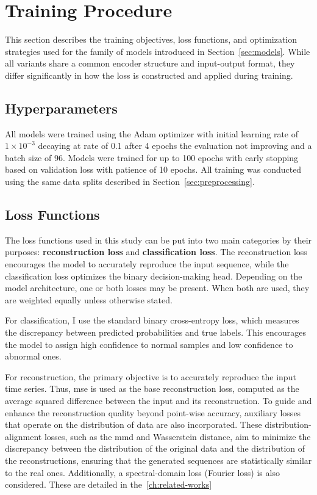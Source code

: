 \section{Training Procedure}
\label{sec:training}
This section describes the training objectives, loss functions, and optimization strategies used for the family of models introduced in Section~\ref{sec:models}.
While all variants share a common encoder structure and input-output format, they differ significantly in how the loss is constructed and applied during training.


\subsection{Hyperparameters}
All models were trained using the Adam optimizer with initial learning rate of $1\times10^{-3}$ decaying at rate of 0.1 after 4 epochs the evaluation not improving and a batch size of 96.
Models were trained for up to 100 epochs with early stopping based on validation loss with patience of 10 epochs.
All training was conducted using the same data splits described in Section~\ref{sec:preprocessing}.


\subsection{Loss Functions}
\label{subsec:loss}
The loss functions used in this study can be put into two main categories by their purposes: \textbf{reconstruction loss} and \textbf{classification loss}.
The reconstruction loss encourages the model to accurately reproduce the input sequence, while the classification loss optimizes the binary decision-making head.
Depending on the model architecture, one or both losses may be present.
When both are used, they are weighted equally unless otherwise stated.

For classification, I use the standard binary cross-entropy loss, which measures the discrepancy between predicted probabilities and true labels.
This encourages the model to assign high confidence to normal samples and low confidence to abnormal ones.

For reconstruction, the primary objective is to accurately reproduce the input time series.
Thus, \gls{mse} is used as the base reconstruction loss, computed as the average squared difference between the input and its reconstruction.
To guide and enhance the reconstruction quality beyond point-wise accuracy, auxiliary losses that operate on the distribution of data are also incorporated.
These distribution-alignment losses, such as the \gls{mmd} and Wasserstein distance, aim to minimize the discrepancy between the distribution of the original data and the distribution of the reconstructions, ensuring that the generated sequences are statistically similar to the real ones.
Additionally, a spectral-domain loss (Fourier loss) is also considered. 
These are detailed in the~\ref{ch:related-works}

